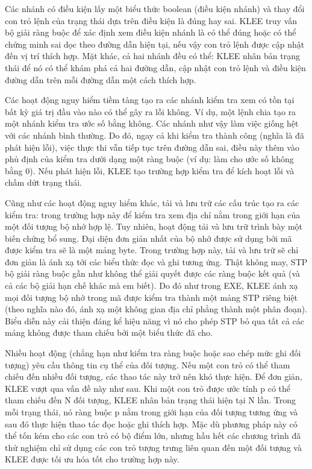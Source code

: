 \documentclass[12pt,a4paper]{report}
\begin{document}
\indent Các nhánh có điều kiện lấy một biểu thức boolean (điều kiện nhánh) và thay đổi con trỏ lệnh của trạng thái dựa trên điều kiện là đúng hay sai. KLEE truy vấn bộ giải ràng buộc để xác định xem điều kiện nhánh là có thể đúng hoặc có thể chứng minh sai dọc theo đường dẫn hiện tại, nếu vậy con trỏ lệnh được cập nhật đến vị trí thích hợp. Mặt khác, cả hai nhánh đều có thể: KLEE nhân bản trạng thái để nó có thể khám phá cả hai đường dẫn, cập nhật con trỏ lệnh và điều kiện đường dẫn trên mỗi đường dẫn một cách thích hợp.

\indent Các hoạt động nguy hiểm tiềm tàng tạo ra các nhánh kiểm tra xem có tồn tại bất kỳ giá trị đầu vào nào có thể gây ra lỗi không. Ví dụ, một lệnh chia tạo ra một nhánh kiểm tra ước số bằng không. Các nhánh như vậy làm việc giống hệt với các nhánh bình thường. Do đó, ngay cả khi kiểm tra thành công (nghĩa là đã phát hiện lỗi), việc thực thi vẫn tiếp tục trên đường dẫn sai, điều này thêm vào phủ định của kiểm tra dưới dạng một ràng buộc (ví dụ: làm cho ước số không bằng 0). Nếu phát hiện lỗi, KLEE tạo trường hợp kiểm tra để kích hoạt lỗi và chấm dứt trạng thái.

\indent Cũng như các hoạt động nguy hiểm khác, tải và lưu trữ các cấu trúc tạo ra các kiểm tra: trong trường hợp này để kiểm tra xem địa chỉ nằm trong giới hạn của một đối tượng bộ nhớ hợp lệ. Tuy nhiên, hoạt động tải và lưu trữ trình bày một biến chứng bổ sung. Đại diện đơn giản nhất của bộ nhớ được sử dụng bởi mã được kiểm tra sẽ là một mảng byte. Trong trường hợp này, tải và lưu trữ sẽ chỉ đơn giản là ánh xạ tới các biểu thức đọc và ghi tương ứng. Thật không may, STP bộ giải ràng buộc gần như không thể giải quyết được các ràng buộc kết quả (và cả các bộ giải hạn chế khác mà em biết). Do đó như trong EXE, KLEE ánh xạ mọi đối tượng bộ nhớ trong mã được kiểm tra thành một mảng STP riêng biệt (theo nghĩa nào đó, ánh xạ một không gian địa chỉ phẳng thành một phân đoạn). Biểu diễn này cải thiện đáng kể hiệu năng vì nó cho phép STP bỏ qua tất cả các mảng không được tham chiếu bởi một biểu thức đã cho. 

\indent Nhiều hoạt động (chẳng hạn như kiểm tra ràng buộc hoặc sao chép mức ghi đối tượng) yêu cầu thông tin cụ thể của đối tượng. Nếu một con trỏ có thể tham chiếu đến nhiều đối tượng, các thao tác này trở nên khó thực hiện. Để đơn giản, KLEE vượt qua vấn đề này như sau. Khi một con trỏ được ước tính p có thể tham chiếu đến N đối tượng, KLEE nhân bản trạng thái hiện tại N lần. Trong mỗi trạng thái, nó ràng buộc p nằm trong giới hạn của đối tượng tương ứng và sau đó thực hiện thao tác đọc hoặc ghi thích hợp. Mặc dù phương pháp này có thể tốn kém cho các con trỏ có bộ điểm lớn, nhưng hầu hết các chương trình đã thử nghiệm chỉ sử dụng các con trỏ tượng trưng liên quan đến một đối tượng và KLEE được tối ưu hóa tốt cho trường hợp này.
\end{document}
